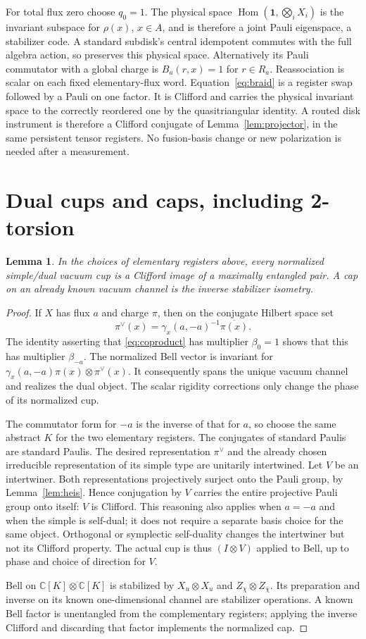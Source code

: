 \documentclass[11pt]{amsart}
\newtheorem{lemma}[theorem]{Lemma}
\theoremstyle{definition}\newtheorem{definition}[theorem]{Definition}
\newcommand{\C}{\mathbb C}
\newcommand{\one}{\mathbf1}
\newcommand{\Hom}{\operatorname{Hom}}
\begin{document}
For total flux zero choose $q_0=1$. The physical space
$\Hom(\one,\bigotimes_i X_i)$ is the invariant subspace for $\rho(x)$,
$x\in A$, and is therefore a joint Pauli eigenspace, a stabilizer code.
A standard subdisk's central idempotent commutes with the full algebra action,
so preserves this physical space. Alternatively its Pauli commutator with a
global charge is $B_a(r,x)=1$ for $r\in R_a$.
Reassociation is scalar on each fixed elementary-flux word.
Equation~\eqref{eq:braid} is a register swap followed by a Pauli on one factor.
It is Clifford and carries the physical invariant space to the correctly
reordered one by the quasitriangular identity. A routed disk instrument is
therefore a Clifford conjugate of Lemma~\ref{lem:projector}, in the same
persistent tensor registers. No fusion-basis change or new polarization is
needed after a measurement.

\section{Dual cups and caps, including 2-torsion}
\begin{lemma}\label{lem:cup}
In the choices of elementary registers above, every normalized simple/dual
vacuum cup is a Clifford image of a maximally entangled pair. A cap on an
already known vacuum channel is the inverse stabilizer isometry.
\end{lemma}
\begin{proof}
If $X$ has flux $a$ and charge $\pi$, then on the conjugate Hilbert space set
\[
 \pi^\vee(x)=\gamma_x(a,-a)^{-1}\overline{\pi(x)}.
\]
The identity asserting that \eqref{eq:coproduct} has multiplier $\beta_0=1$
shows that this has multiplier $\beta_{-a}$. The normalized Bell vector is
invariant for $\gamma_x(a,-a)\pi(x)\otimes\pi^\vee(x)$. It consequently
spans the unique vacuum channel and realizes the dual object. The scalar
rigidity corrections only change the phase of its normalized cup.

The commutator form for $-a$ is the inverse of that for $a$, so choose the
same abstract $K$ for the two elementary registers. The conjugates of standard
Paulis are standard Paulis. The desired representation $\pi^\vee$ and the
already chosen irreducible representation of its simple type are unitarily
intertwined. Let $V$ be an intertwiner. Both representations projectively
surject onto the Pauli group, by Lemma~\ref{lem:heis}. Hence conjugation by $V$
carries the entire projective Pauli group onto itself: $V$ is Clifford.
This reasoning also applies when $a=-a$ and when the simple is self-dual;
it does not require a separate basis choice for the same object. Orthogonal
or symplectic self-duality changes the intertwiner but not its Clifford property.
The actual cup is thus $(I\otimes V)$ applied to Bell, up to phase and choice
of direction for $V$.

Bell on $\C[K]\otimes\C[K]$ is stabilized by $X_u\otimes X_u$ and
$Z_\chi\otimes Z_{\bar\chi}$. Its preparation and inverse on its known
one-dimensional channel are stabilizer operations. A known Bell factor is
unentangled from the complementary registers; applying the inverse Clifford
and discarding that factor implements the normalized cap.
\end{proof}
\end{document}
